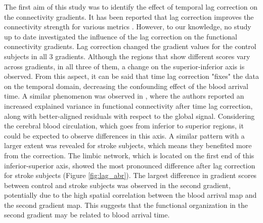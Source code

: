 \documentclass[fleqn,10pt]{wlscirep}
\begin{document}
The first aim of this study was to identify the effect of temporal lag correction on the connectivity gradients. It has been reported that lag correction improves the connectivity strength for various metrics \citep{siegel2016effects, erdougan2016correcting, tong2019low}. However, to our knowledge, no study up to date investigated the influence of the lag correction on the functional connectivity gradients. Lag correction changed the gradient values for the control subjects in all 3 gradients. Although the regions that show different scores vary across gradients, in all three of them, a change on the superior-inferior axis is observed. From this aspect, it can be said that time lag correction "fixes" the data on the temporal domain, decreasing the confounding effect of the blood arrival time. A similar phenomenon was observed in \citet{erdougan2016correcting}, where the authors reported an increased explained variance in functional connectivity after time lag correction, along with better-aligned residuals with respect to the global signal. Considering the cerebral blood circulation, which goes from inferior to superior regions, it could be expected to observe differences in this axis. A similar pattern with a larger extent was revealed for stroke subjects, which means they benefited more from the correction. The limbic network, which is located on the first end of this inferior-superior axis, showed the most pronounced difference after lag correction for stroke subjects (Figure \ref{fig:lag_abr}). The largest difference in gradient scores between control and stroke subjects was observed in the second gradient, potentially due to the high spatial correlation between the blood arrival map and the second gradient map. This suggests that the functional organization in the second gradient may be related to blood arrival time.
\end{document}
